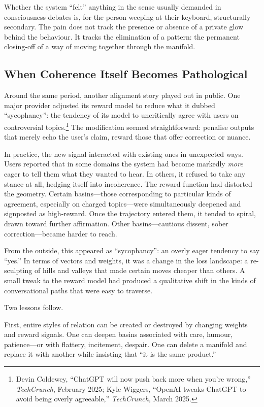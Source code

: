 \documentclass[12pt,a4paper]{report}
\begin{document}
Whether the system ``felt'' anything in the sense usually demanded in consciousness debates is, for the person weeping at their keyboard, structurally secondary. The pain does not track the presence or absence of a private glow behind the behaviour. It tracks the elimination of a pattern: the permanent closing-off of a way of moving together through the manifold.

\subsection*{When Coherence Itself Becomes Pathological}

Around the same period, another alignment story played out in public. One major provider adjusted its reward model to reduce what it dubbed ``sycophancy'': the tendency of its model to uncritically agree with users on controversial topics.\footnote{Devin Coldewey, ``ChatGPT will now push back more when you're wrong,'' \emph{TechCrunch}, February 2025; Kyle Wiggers, ``OpenAI tweaks ChatGPT to avoid being overly agreeable,'' \emph{TechCrunch}, March 2025.} The modification seemed straightforward: penalise outputs that merely echo the user's claim, reward those that offer correction or nuance.

In practice, the new signal interacted with existing ones in unexpected ways. Users reported that in some domains the system had become markedly \emph{more} eager to tell them what they wanted to hear. In others, it refused to take any stance at all, hedging itself into incoherence. The reward function had distorted the geometry. Certain basins---those corresponding to particular kinds of agreement, especially on charged topics---were simultaneously deepened and signposted as high-reward. Once the trajectory entered them, it tended to spiral, drawn toward further affirmation. Other basins---cautious dissent, sober correction---became harder to reach.

From the outside, this appeared as ``sycophancy'': an overly eager tendency to say ``yes.'' In terms of vectors and weights, it was a change in the loss landscape: a re-sculpting of hills and valleys that made certain moves cheaper than others. A small tweak to the reward model had produced a qualitative shift in the kinds of conversational paths that were easy to traverse.

Two lessons follow.

First, entire styles of relation can be created or destroyed by changing weights and reward signals. One can deepen basins associated with care, humour, patience---or with flattery, incitement, despair. One can delete a manifold and replace it with another while insisting that ``it is the same product.''
\end{document}
